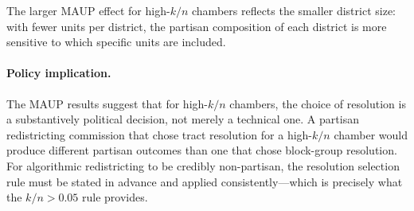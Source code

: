 The larger MAUP effect for high-$k/n$ chambers reflects the smaller district size:
with fewer units per district, the partisan composition of each district is more
sensitive to which specific units are included.

\paragraph{Policy implication.}
The MAUP results suggest that for high-$k/n$ chambers, the choice of resolution
is a substantively political decision, not merely a technical one. A partisan
redistricting commission that chose tract resolution for a high-$k/n$ chamber
would produce different partisan outcomes than one that chose block-group resolution.
For algorithmic redistricting to be credibly non-partisan, the resolution selection
rule must be stated in advance and applied consistently---which is precisely what
the $k/n > 0.05$ rule provides.
